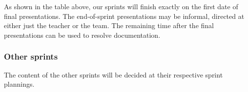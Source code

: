 \documentclass[a4paper]{llncs}
\begin{document}
As shown in the table above, our sprints will finish exactly on the first
date of final presentations. The end-of-sprint presentations may
be informal, directed at either just the teacher or the team.
The remaining time after the final presentations can be used to
resolve documentation.

\subsubsection*{Other sprints} The content of the other sprints will be
decided at their respective sprint plannings.
\end{document}
